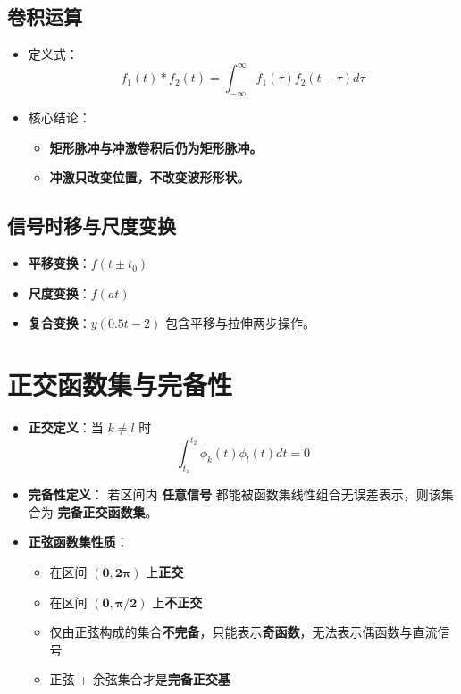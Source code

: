 \subsection{卷积运算}
\begin{itemize}
\item 定义式：
  \[
  f_1(t)*f_2(t)=\int_{-\infty}^{\infty}f_1(\tau)f_2(t-\tau)d\tau
  \]
\item 核心结论：
  \begin{itemize}
  \item \textbf{矩形脉冲与冲激卷积后仍为矩形脉冲。}
  \item \textbf{冲激只改变位置，不改变波形形状。}
  \end{itemize}
\end{itemize}

\subsection{信号时移与尺度变换}
\begin{itemize}
\item \textbf{平移变换}：$f(t\pm t_0)$
\item \textbf{尺度变换}：$f(at)$
\item \textbf{复合变换}：$y(0.5t-2)$ 包含平移与拉伸两步操作。
\end{itemize}

\section{正交函数集与完备性}
\begin{itemize}
\item \textbf{正交定义}：当 $k\neq l$ 时
  \[
  \int_{t_1}^{t_2}\phi_k(t)\phi_l(t)dt = 0
  \]

\item \textbf{完备性定义}：
若区间内 \textbf{任意信号} 都能被函数集线性组合无误差表示，则该集合为 \textbf{完备正交函数集}。

\item \textbf{正弦函数集性质}：
  \begin{itemize}
  \item 在区间 $\boldsymbol{(0,2\pi)}$ 上\textbf{正交}
  \item 在区间 $\boldsymbol{(0,\pi/2)}$ 上\textbf{不正交}
  \item 仅由正弦构成的集合\textbf{不完备}，只能表示\textbf{奇函数}，无法表示偶函数与直流信号
  \item 正弦 + 余弦集合才是\textbf{完备正交基}
  \end{itemize}
\end{itemize}

